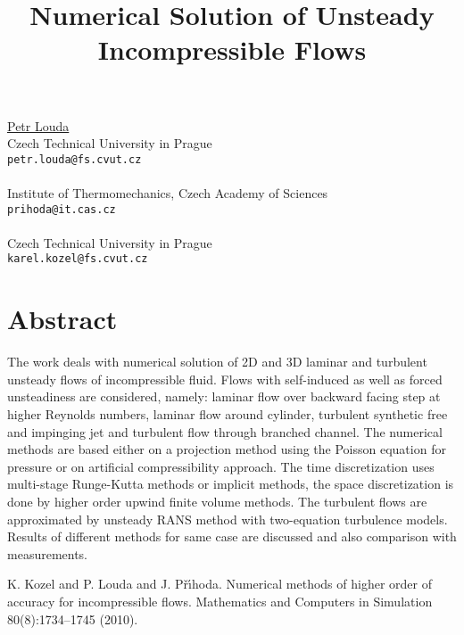 \title{Numerical Solution of Unsteady Incompressible Flows}
 \author{} \institute{}
\maketitle
\begin{center}
{\large \underline{Petr Louda}}\\
Czech Technical University in Prague\\
{\tt petr.louda@fs.cvut.cz}
\\ \\
Institute of Thermomechanics, Czech Academy of Sciences\\
{\tt prihoda@it.cas.cz}
\\ \vspace{4mm}{\large Karel Kozel}\\
Czech Technical University in Prague\\
{\tt karel.kozel@fs.cvut.cz}

\end{center}

\section*{Abstract}

The work deals with numerical solution of 2D and 3D laminar and
turbulent unsteady flows of incompressible fluid. Flows with
self-induced as well as forced unsteadiness are considered, namely:
laminar flow over backward facing step at higher Reynolds numbers,
laminar flow around cylinder, turbulent synthetic free and impinging
jet and turbulent flow through branched channel. The numerical methods
are based either on a projection method using the Poisson equation for
pressure or on artificial 
compressibility approach. The time discretization uses multi-stage
Runge-Kutta methods or implicit methods, the space discretization is
done by higher order upwind finite volume methods. The turbulent flows
are approximated by unsteady RANS method with two-equation turbulence
models. Results of different methods for same case are discussed and
also comparison with measurements.



\begin{thebibliography}{10}

{\sc K. Kozel and P. Louda and J. P\v{r}\'\i{h}oda}. {Numerical methods of higher order of accuracy for incompressible   flows}. Mathematics and Computers in Simulation 80(8):1734--1745 (2010).

\end{thebibliography}
